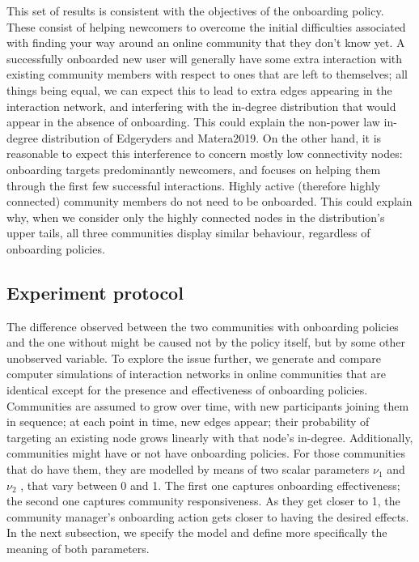 This set of results is consistent with the objectives of the onboarding policy. These consist of helping newcomers to overcome the initial difficulties associated with finding your way around an online community that they don't know yet. A successfully onboarded new user will generally have some extra interaction with existing community members with respect to ones that are left to themselves; all things being equal, we can expect this to lead to extra edges appearing in the interaction network, and interfering with the in-degree distribution that would appear in the absence of onboarding. This could explain the non-power law in-degree distribution of Edgeryders and Matera2019. On the other hand, it is reasonable to expect this interference to concern mostly low connectivity nodes: onboarding targets predominantly newcomers, and focuses on helping them through the first few successful interactions. Highly active (therefore highly connected) community members do not need to be onboarded. This could explain why, when we consider only the highly connected nodes in the distribution's upper tails, all three communities display similar behaviour, regardless of onboarding policies. 

\subsection{Experiment protocol}
The difference observed between the two communities with onboarding policies and the one without might be caused not by the policy itself, but by some other unobserved variable. To explore the issue further, we generate and compare computer simulations of interaction networks in online communities that are identical except for the presence and effectiveness of onboarding policies. Communities are assumed to grow over time, with new participants joining them in sequence; at each point in time, new edges appear; their probability of targeting an existing node grows linearly with that node's in-degree. Additionally, communities might have or not have onboarding policies. For those communities that do have them, they are modelled by means of two scalar parameters $\nu_1$  and $\nu_2$ , that vary between 0 and 1. The first one captures onboarding effectiveness;  the second one captures community responsiveness. As they get closer to 1, the community manager's onboarding action gets closer to having the desired effects. In the next subsection, we specify the model and define more specifically the meaning of both parameters.

